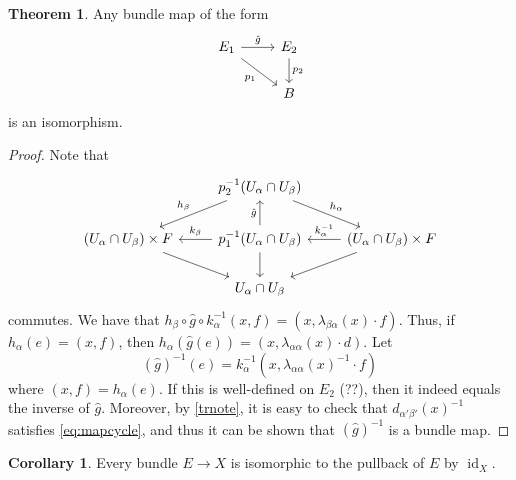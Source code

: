 \documentclass[10pt,letterpaper,cm]{nupset}
\theoremstyle{definition}
\theoremstyle{theorem}
\newtheorem{theorem}[defn]{Theorem}
\newtheorem{corollary}[defn]{Corollary}
\theoremstyle{remark}
\newcommand{\1}{\mathbb{1}}
\newcommand{\0}{\vec 0}
\DeclareMathOperator{\id}{id}
\begin{document}
\begin{theorem}
Any bundle map of the form
\[
\begin{tikzcd}
E_1 \arrow[rd, "p_1"'] \arrow[r, "\hat{g}"] & E_2 \arrow[d, "p_2"] \\
                                            & B                   
\end{tikzcd}
\]
is an isomorphism.
\end{theorem}
\begin{proof}
Note that
\[
\begin{tikzcd}
                                                         & p_2^{-1}(U_{\alpha}\cap U_{\beta}) \arrow[ld, "h_{\beta}"'] \arrow[rd, "h_{\alpha}"]      &                                                                                          \\
\left(U_{\alpha}\cap U_{\beta}\right)\times F \arrow[rd] & p_1^{-1}(U_{\alpha}\cap U_{\beta}) \arrow[u, "\hat{g}"] \arrow[d] \arrow[l, "k_{\beta}"'] & \left(U_{\alpha}\cap U_{\beta}\right)\times F \arrow[l, "k_{\alpha}^{-1}"'] \arrow[ld] \\
                                                         & U_{\alpha}\cap U_{\beta}                                                                    &                                                                                         
\end{tikzcd}
\] commutes.  We have that $h_{\beta} \circ \hat{g} \circ k_{\alpha}^{-1}(x,f) = (x, \lambda_{\beta{\alpha}}(x)\cdot f)$. Thus, if  $h_{\alpha}(e) = (x,f)$, then $h_{\alpha}\left(\hat{g}(e)\right) = (x, \lambda_{\alpha{\alpha}}(x) \cdot d).$ Let $$\left(\hat{g}\right)^{-1}(e) = k_{\alpha}^{-1}\left(x, \lambda_{\alpha{\alpha}}(x)^{-1}\cdot f\right)$$ where $(x,f) = h_{\alpha}(e)$. If this is well-defined on $E_2$ (??), then it indeed equals the inverse of $\hat{g}$.  Moreover, by \cref{trnote}, it is easy to check that $d_{\alpha'{\beta'}}(x)^{-1}$ satisfies \eqref{eq:mapcycle}, and thus it can be shown that $\left(\hat{g}\right)^{-1}$ is a bundle map.

\end{proof}

\begin{corollary}
Every bundle $E\to X$ is isomorphic to the pullback of $E$ by $\id_X$.
\end{corollary}
\end{document}

